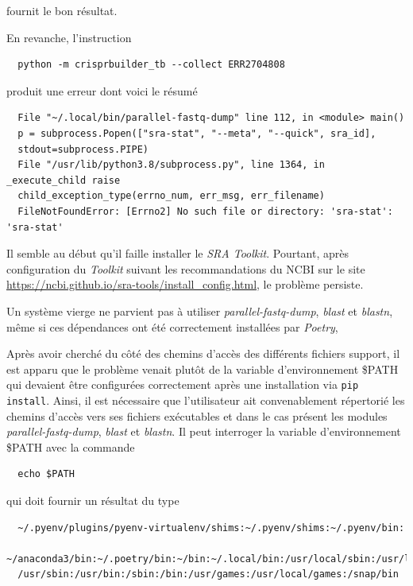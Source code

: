 \documentclass[twoside,a4paper,11pt,frenchb,openany]{report}
\begin{document}
fournit le bon résultat.

En revanche, l'instruction

\begin{verbatim}
  python -m crisprbuilder_tb --collect ERR2704808
\end{verbatim}

produit une erreur dont voici le résumé

\begin{verbatim}
  File "~/.local/bin/parallel-fastq-dump" line 112, in <module> main()
  p = subprocess.Popen(["sra-stat", "--meta", "--quick", sra_id], 
  stdout=subprocess.PIPE)
  File "/usr/lib/python3.8/subprocess.py", line 1364, in _execute_child raise 
  child_exception_type(errno_num, err_msg, err_filename)
  FileNotFoundError: [Errno2] No such file or directory: 'sra-stat': 'sra-stat'
\end{verbatim}

Il semble au début qu'il faille installer le \textit{SRA Toolkit}. Pourtant, après configuration du \textit{Toolkit} suivant les recommandations du NCBI sur le site \url{https://ncbi.github.io/sra-tools/install_config.html}, le problème persiste.

Un système vierge ne parvient pas à utiliser \textit{parallel-fastq-dump}, \textit{blast} et \textit{blastn}, même si ces dépendances ont été correctement installées par \textit{Poetry}, 

Après avoir cherché du côté des chemins d'accès des différents fichiers support, il est apparu que le problème venait plutôt de la variable d'environnement \$PATH qui devaient être configurées correctement après une installation via \texttt{pip install}. Ainsi, il est nécessaire que l'utilisateur ait convenablement répertorié les chemins d'accès vers ses fichiers exécutables et dans le cas présent les modules \textit{parallel-fastq-dump}, \textit{blast} et \textit{blastn}. Il peut interroger la variable d'environnement \$PATH avec la commande

\begin{verbatim}
  echo $PATH
\end{verbatim}

qui doit fournir un résultat du type
\begin{verbatim}
  ~/.pyenv/plugins/pyenv-virtualenv/shims:~/.pyenv/shims:~/.pyenv/bin:
  ~/anaconda3/bin:~/.poetry/bin:~/bin:~/.local/bin:/usr/local/sbin:/usr/local/bin:
  /usr/sbin:/usr/bin:/sbin:/bin:/usr/games:/usr/local/games:/snap/bin
\end{verbatim}
\end{document}
